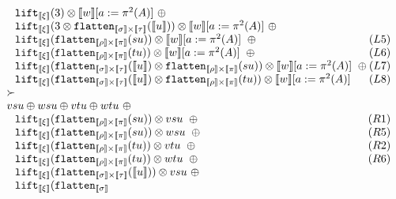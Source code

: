 \documentclass[runningheads,a4paper]{llncs}
\newcommand{\typeinterpret}[1]{\llbracket #1 \rrbracket}
\newcommand{\interpret}[1]{\llbracket #1 \rrbracket}
\newcommand{\flatten}{\mathtt{flatten}}
\newcommand{\lift}{\mathtt{lift}}
\begin{document}
\begin{itemize}
\[\begin{array}{l}
  \phantom{A}
    \lift_{\typeinterpret{\xi}}(3) \otimes \interpret{w}[a:=\pi^2(A)]
    \ \oplus \\
  \phantom{A}
    \lift_{\typeinterpret{\xi}}(3 \otimes
    \flatten_{\typeinterpret{\sigma} \times \typeinterpret{\tau}}(
    \interpret{u})) \otimes
    \interpret{w}[a:=\pi^2(A)]
    \ \oplus \\
  \phantom{A}
    \lift_{\typeinterpret{\xi}}(\flatten_{\typeinterpret{\rho} \times
    \typeinterpret{\pi}}(su)) \otimes
    \interpret{w}[a:=\pi^2(A)]
    \ \oplus \hfill (L5) \\
  \phantom{A}
    \lift_{\typeinterpret{\xi}}(\flatten_{\typeinterpret{\rho} \times
    \typeinterpret{\pi}}(tu)) \otimes
    \interpret{w}[a:=\pi^2(A)]
    \ \oplus \hfill (L6) \\
  \phantom{A}
    \lift_{\typeinterpret{\xi}}(\flatten_{\typeinterpret{\sigma} \times
    \typeinterpret{\tau}}(\interpret{u}) \otimes
    \flatten_{\typeinterpret{\rho} \times \typeinterpret{\pi}}(su))
    \otimes
    \interpret{w}[a:=\pi^2(A)]
    \ \oplus \hfill (L7) \\
  \phantom{A}
    \lift_{\typeinterpret{\xi}}(\flatten_{\typeinterpret{\sigma} \times
    \typeinterpret{\tau}}(\interpret{u}) \otimes
    \flatten_{\typeinterpret{\rho} \times \typeinterpret{\pi}}(tu))
    \otimes
    \interpret{w}[a:=\pi^2(A)] \hfill (L8) \\
  \succ \\
  vsu \oplus wsu \oplus
    vtu \oplus wtu\ \oplus \\
  \phantom{A}
    \lift_{\typeinterpret{\xi}}(\flatten_{\typeinterpret{\rho} \times
    \typeinterpret{\pi}}(su)) \otimes vsu\ \oplus
    \hfill (R1) \\
  \phantom{A}
    \lift_{\typeinterpret{\xi}}(\flatten_{\typeinterpret{\rho}
    \times \typeinterpret{\pi}}(su)) \otimes wsu\ \oplus
    \hfill (R5) \\
  \phantom{A}
    \lift_{\typeinterpret{\xi}}(\flatten_{\typeinterpret{\rho} \times
    \typeinterpret{\pi}}(tu)) \otimes vtu\ \oplus \hfill (R2) \\
  \phantom{A}
    \lift_{\typeinterpret{\xi}}(\flatten_{\typeinterpret{\rho}
    \times \typeinterpret{\pi}}(tu)) \otimes wtu\ \oplus
    \hfill (R6) \\
  \phantom{A}
    \lift_{\typeinterpret{\xi}}(\flatten_{\typeinterpret{\sigma}
    \times \typeinterpret{\tau}}(\interpret{u})) \otimes vsu\ \oplus \\
  \phantom{A}
    \lift_{\typeinterpret{\xi}}(\flatten_{\typeinterpret{\sigma}
}
\end{array}\]
\end{itemize}
\end{document}
